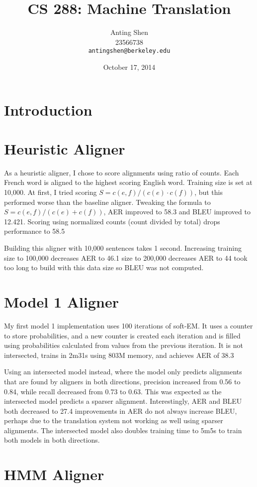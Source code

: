 \documentclass[11pt]{article}
\title{CS 288: Machine Translation}
\author{Anting Shen \\
  23566738 \\
  {\tt antingshen@berkeley.edu} \\
}
\date{October 17, 2014}
\begin{document}
\maketitle

\section{Introduction}


\section{Heuristic Aligner}

As a heuristic aligner, I chose to score alignments using ratio of counts. Each French word
is aligned to the highest scoring English word. Training size is set at 10,000.
At first, I tried scoring $S = c(e, f) / (c(e) \cdot c(f))$, but this performed worse than the
baseline aligner. Tweaking the formula to $S = c(e, f) / (c(e) + c(f))$, AER improved to 58.3%
and BLEU improved to 12.421. Scoring using normalized counts (count divided by total) drops
performance to 58.5%

Building this aligner with 10,000 sentences takes 1 second. Increasing training size to 100,000
decreases AER to 46.1%
size to 200,000 decreases AER to 44%
took too long to build with this data size so BLEU was not computed.

\section{Model 1 Aligner}

My first model 1 implementation uses 100 iterations of soft-EM. It uses a counter to store
probabilities, and a new counter is created each iteration and is filled using probabilities
calculated from values from the previous iteration. It is not intersected, trains in 2m31s
using 803M memory, and achieves AER of 38.3%

Using an intersected model instead, where the model only predicts alignments that are found by
aligners in both directions, precision increased from 0.56 to 0.84, while recall decreased from
0.73 to 0.63. This was expected as the intersected model predicts a sparser alignment.
Interestingly, AER and BLEU both decreased to 27.4%
improvements in AER do not always increase BLEU, perhaps due to the translation system
not working as well using sparser alignments. The intersected model also doubles training time
to 5m5s to train both models in both directions.

\section{HMM Aligner}
\end{document}

